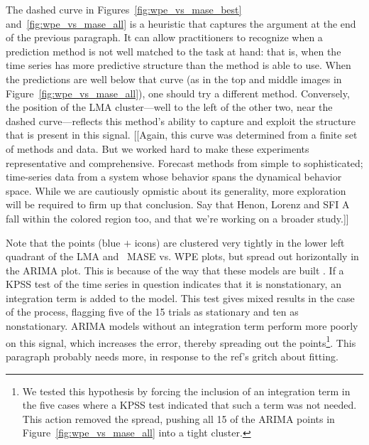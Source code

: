 The dashed curve in Figures~\ref{fig:wpe_vs_mase_best}
and~\ref{fig:wpe_vs_mase_all} is a heuristic that captures the
argument at the end of the previous paragraph.  It can allow
practitioners to recognize when a prediction method is not well
matched to the task at hand: that is, when the time series has more
predictive structure than the method is able to use.  When the
predictions are well below that curve (as in the top and middle images
in Figure~\ref{fig:wpe_vs_mase_all}), one should try a different
method.  Conversely, the position of the LMA cluster---well to the
left of the other two, near the dashed curve---reflects this method's
ability to capture and exploit the structure that is present in this
signal.  [[Again, this curve was determined from a finite set of
    methods and data.  But we worked hard to make these experiments
    representative and comprehensive.  Forecast methods from simple to
    sophisticated; time-series data from a system whose behavior spans
    the dynamical behavior space.  While we are cautiously opmistic
    about its generality, more exploration will be required to firm up
    that conclusion.  Say that Henon, Lorenz and SFI A fall within the
    colored region too, and that we're working on a broader study.]]

Note that the \col points (blue {\color{blue}$+$} icons) are clustered
very tightly in the lower left quadrant of the LMA and \naive ~MASE
vs. WPE plots, but spread out horizontally in the ARIMA plot.  This is
because of the way that these models are built \cite{autoARIMA}.  If a
KPSS test of the time series in question indicates that it is
nonstationary, an integration term is added to the model.  This test
gives mixed results in the case of the \col process, flagging five of
the 15 trials as stationary and ten as nonstationary.  ARIMA models
without an integration term perform more poorly on this signal, which
increases the error, thereby spreading out the points\footnote{We
  tested this hypothesis by forcing the inclusion of an integration
  term in the five cases where a KPSS test indicated that such a term
  was not needed.  This action removed the spread, pushing all 15 of
  the \col ARIMA points in Figure~\ref{fig:wpe_vs_mase_all} into a
  tight cluster.}.  \alert{This paragraph probably needs more, in
  response to the ref's gritch about fitting.}

